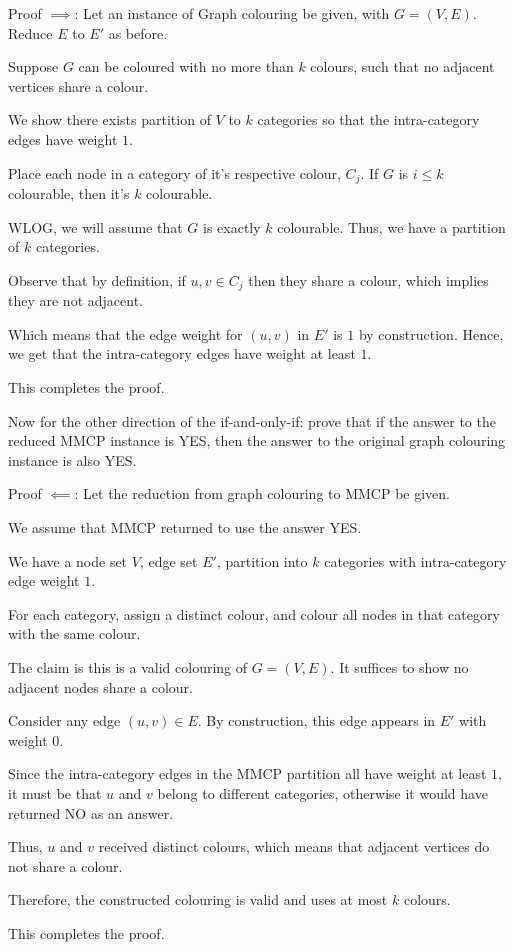 \begin{questions}
\begin{soln}
		Proof \(\implies\): Let an instance of Graph colouring be given, with \(G = (V, E)\). Reduce \(E\) to \(E'\) as before.

		Suppose \(G\) can be coloured with no more than \(k\) colours, such that no adjacent vertices share a colour.

		We show there exists partition of \(V\) to \(k\) categories so that the intra-category edges have weight \(1\).

		Place each node in a category of it's respective colour, \(C_j\). If \(G\) is \(i \leq k\) colourable, then it's \(k\) colourable.

		WLOG, we will assume that \(G\) is exactly \(k\) colourable. Thus, we have a partition of \(k\) categories.

		Observe that by definition, if \(u, v \in C_j\) then they share a colour, which implies they are not adjacent.

		Which means that the edge weight for \((u, v)\) in \(E'\) is \(1\) by construction. Hence, we get that the intra-category edges have weight at least \(1\).

		This completes the proof.


	\end{soln}

	\question[3] Now for the other direction of the if-and-only-if: prove that if the answer to the reduced MMCP instance is YES, then the answer to the original graph colouring instance is also YES.

	\ifsolutions\fi

	\begin{soln}
		Proof \(\impliedby\): Let the reduction from graph colouring to MMCP be given.

		We assume that MMCP returned to use the answer YES.

		We have a node set \(V\), edge set \(E'\), partition into \(k\) categories with intra-category edge weight \(1\).

		For each category, assign a distinct colour, and colour all nodes in that category with the same colour.

		The claim is this is a valid colouring of \(G = (V, E)\). It suffices to show no adjacent nodes share a colour.

		Consider any edge \((u, v) \in E\). By construction, this edge appears in \(E'\) with weight \(0\).

		Since the intra-category edges in the MMCP partition all have weight at least \(1\), it must be that \(u\) and \(v\) belong to different categories,
		otherwise it would have returned NO as an answer.

		Thus, \(u\) and \(v\) received distinct colours, which means that adjacent vertices do not share a colour.

		Therefore, the constructed colouring is valid and uses at most \(k\) colours.

		This completes the proof.

	\end{soln}

\end{questions}

